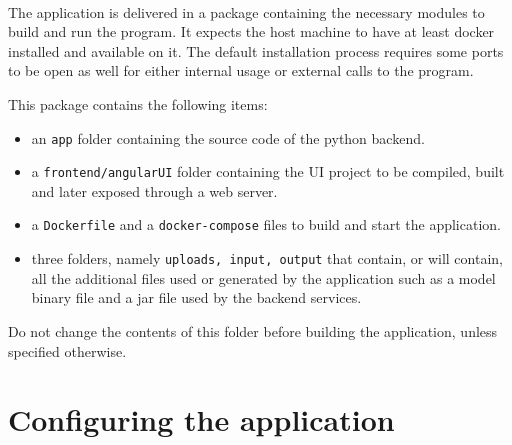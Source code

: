 \documentclass{scrreprt}
\begin{document}
\paragraph{}The application is delivered in a package containing the necessary modules to build and run the program. It expects the host machine to have at least docker installed and available on it. The default installation process requires some ports to be open as well for either internal usage or external calls to the program.

This package contains the following items:
\begin{itemize}
	\item an \texttt{app} folder containing the source code of the python backend.
	\item a \texttt{frontend/angularUI} folder containing the UI project to be compiled, built and later exposed through a web server.
	\item a \texttt{Dockerfile} and a \texttt{docker-compose} files to build and start the application.
	\item three folders, namely \texttt{uploads, input, output} that contain, or will contain, all the additional files used or generated by the application such as a model binary file and a jar file used by the backend services.
\end{itemize}
Do not change the contents of this folder before building the application, unless specified otherwise.

\section{Configuring the application}
\end{document}
